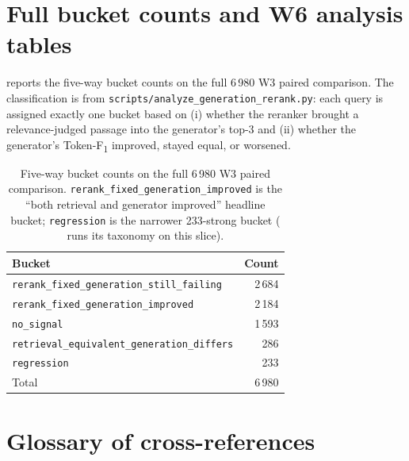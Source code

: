 \documentclass[11pt,a4paper]{article}
\newcommand{\fdev}{6\,980}
\newcommand{\F}{F\textsubscript{1}}
\newcommand{\Tokenf}{Token-\F}
\begin{document}
\section{Full bucket counts and W6 analysis tables}
\label{sec:appendix-buckets}

 reports the five-way bucket counts on the
full \fdev{} W3 paired comparison.  The classification is from
\texttt{scripts/analyze\_generation\_rerank.py}: each query is
assigned exactly one bucket based on (i) whether the reranker
brought a relevance-judged passage into the generator's top-3 and
(ii) whether the generator's \Tokenf{} improved, stayed equal,
or worsened.

\begin{table}[H]
  \centering
  \caption{Five-way bucket counts on the full \fdev{} W3 paired
  comparison.  \texttt{rerank\_fixed\_generation\_improved} is the
  ``both retrieval and generator improved'' headline bucket;
  \texttt{regression} is the narrower 233-strong bucket
  ( runs its taxonomy on this slice).}
  \label{tab:buckets-full}
  \begin{tabular}{lr}
    \toprule
    Bucket                                                       & Count \\
    \midrule
    \texttt{rerank\_fixed\_generation\_still\_failing}           & 2\,684 \\
    \texttt{rerank\_fixed\_generation\_improved}                 & 2\,184 \\
    \texttt{no\_signal}                                          & 1\,593 \\
    \texttt{retrieval\_equivalent\_generation\_differs}          &   286 \\
    \texttt{regression}                                          &   233 \\
    \midrule
    Total                                                        & 6\,980 \\
    \bottomrule
  \end{tabular}
\end{table}

\section{Glossary of cross-references}
\label{sec:appendix-glossary}
\end{document}
